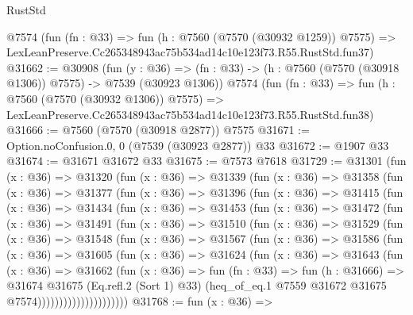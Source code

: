 \begin{lexlean}{RustStd}
\begin{coremodule}
    @7574
    (fun (fn : @33) =>
    fun (h : @7560 (@7570 (@30932 @1259)) @7575) =>
    LexLeanPreserve.Cc265348943ac75b534ad14c10e123f73.R55.RustStd.fun37)
@31662 := @30908
    (fun (y : @36) =>
    (fn : @33) -> (h : @7560 (@7570 (@30918 @1306)) @7575) -> @7539 (@30923 @1306))
    @7574
    (fun (fn : @33) =>
    fun (h : @7560 (@7570 (@30932 @1306)) @7575) =>
    LexLeanPreserve.Cc265348943ac75b534ad14c10e123f73.R55.RustStd.fun38)
@31666 := @7560 (@7570 (@30918 @2877)) @7575
@31671 := Option.noConfusion.{0, 0} (@7539 (@30923 @2877)) @33
@31672 := @1907 @33
@31674 := @31671 @31672 @33
@31675 := @7573 @7618
@31729 := @31301
    (fun (x : @36) =>
    @31320
      (fun (x : @36) =>
      @31339
        (fun (x : @36) =>
        @31358
          (fun (x : @36) =>
          @31377
            (fun (x : @36) =>
            @31396
              (fun (x : @36) =>
              @31415
                (fun (x : @36) =>
                @31434
                  (fun (x : @36) =>
                  @31453
                    (fun (x : @36) =>
                    @31472
                      (fun (x : @36) =>
                      @31491
                        (fun (x : @36) =>
                        @31510
                          (fun (x : @36) =>
                          @31529
                            (fun (x : @36) =>
                            @31548
                              (fun (x : @36) =>
                              @31567
                                (fun (x : @36) =>
                                @31586
                                  (fun (x : @36) =>
                                  @31605
                                    (fun (x : @36) =>
                                    @31624
                                      (fun (x : @36) =>
                                      @31643
                                        (fun (x : @36) =>
                                        @31662
                                          (fun (x : @36) =>
                                          fun (fn : @33) =>
                                          fun (h : @31666) =>
                                          @31674
                                            @31675
                                            (Eq.refl.{2} (Sort 1) @33)
                                            (heq_of_eq.{1}
                                              @7559
                                              @31672
                                              @31675
                                              @7574)))))))))))))))))))))
@31768 := fun (x : @36) =>

\end{coremodule}
\end{lexlean}
